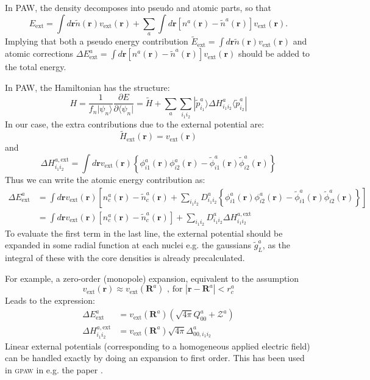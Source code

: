 \documentclass[a4paper]{article}
\newcommand{\gpaw}{\textsc{gpaw}}
\newcommand{\s}[1]{\tilde{#1}}
\newcommand{\ext}{\text{ext}}
\newcommand{\br}{\mathbf{r}}
\newcommand{\bR}{\mathbf{R}}
\newcommand{\bra}[1]{\langle #1 |}
\newcommand{\ket}[1]{| #1 \rangle}
\begin{document}
In PAW, the density decomposes into pseudo and atomic parts, so that
%
\begin{equation*}
  E_\ext = \int d\br \s{n}(\br)v_\ext(\br) + \sum_a \int d\br \left[n^a(\br) - \s{n}^a(\br)\right]v_\ext(\br).
\end{equation*}
%
Implying that both a pseudo energy contribution $\s{E}_\ext = \int
d\br \s{n}(\br)v_\ext(\br)$ and atomic corrections $\Delta E_\ext^a =
\int d\br \left[n^a(\br) - \s{n}^a(\br)\right]v_\ext(\br)$ should be
added to the total energy.
\par In PAW, the Hamiltonian has the structure:
%
\begin{equation*}
  H = \frac{1}{f_n\ket{\psi_n}}\frac{\partial E}{\partial \bra{\psi_n}} = \s{H} + \sum_a \sum_{i_1i_2}\ket{\s{p}^a_{i_1}}\Delta H^a_{i_1i_2} \bra{\s{p}^a_{i_2}}
\end{equation*}
%
In our case, the extra contributions due to the external potential are:
%
\begin{equation*}
  \s{H}_\ext(\br) = v_\ext(\br)
\end{equation*}
%
and
\begin{equation}\label{eq: atomic hamiltonian}
  \Delta H^{a,\ext}_{i_1i_2} = \int d\br v_\ext(\br) \left\{\phi_{i1}^a(\br)\phi_{i2}^a(\br) - \s{\phi}_{i1}^a(\br)\s{\phi}_{i2}^a(\br)\right\}
\end{equation}
%
Thus we can write the atomic energy contribution as:
%
\begin{equation*}
  \begin{split}
    \Delta E^a_\ext &= \int d\br v_\ext(\br)\left[n_c^a(\br)-\s{n}_c^a(\br) + \sum_{i_1i_2}D^a_{i_1i_2}\left\{\phi_{i1}^a(\br)\phi_{i2}^a(\br) - \s{\phi}_{i1}^a(\br)\s{\phi}_{i2}^a(\br)\right\}\right]\\
    &= \int d\br v_\ext(\br)\left[n_c^a(\br)-\s{n}_c^a(\br)\right] + \sum_{i_1i_2}D^a_{i_1i_2}\Delta H^{a,\ext}_{i_1i_2}
  \end{split}
\end{equation*}
%
To evaluate the first term in the last line, the external potential
should be expanded in some radial function at each nuclei e.g. the
gaussians $\tilde{g}^a_{L}$, as the integral of these with the core
densities is already precalculated.

For example, a zero-order (monopole) expansion, equivalent to the
assumption
%
\begin{equation*}
  v_\ext(\br) \approx v_\ext(\bR^a) \text{ , for } |\br-\bR^a| < r_c^a
\end{equation*}
%
Leads to the expression:
%
\begin{equation*}
  \begin{split}
    \Delta E^a_\ext &= v_\ext(\bR^a) (\sqrt{4\pi} Q_{00}^a + \mathcal{Z}^a)\\
    \Delta H^{a,\ext}_{i_1i_2} &= v_\ext(\bR^a) \sqrt{4\pi} \Delta_{00, i_1i_2}^a
  \end{split}
\end{equation*}
%
Linear external potentials (corresponding to a homogeneous applied
electric field) can be handled exactly by doing an expansion to first
order. This has been used in \gpaw{} in e.g. the paper \cite{Yin2009}.
\end{document}
